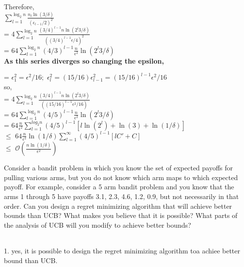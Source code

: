 \documentclass[addpoints,12pt,solution]{exam}
\begin{document}
\begin{questions}
\begin{solution}
Therefore, \\
$\sum_{l=1}^{\log_2 n} \frac{n_l \ln(3/\delta)}{(\epsilon_{l-1}/2)^2}$ \\
= $4 \sum_{l=1}^{\log_2 n} \frac{(3/4)^{l-1}n \ln(2^l 3/\delta)}{((3/4)^{l-1}\epsilon/4)^2}$ \\
= $64 \sum_{l=1}^{\log_2 n} (4/3)^{l-1} \frac{n }{\epsilon^2}\ln(2^l 3/\delta)$ \\
\textbf{As this series diverges so changing the epsilon,}

= $\epsilon_1^2 = \epsilon^2/16 ; $ $\epsilon_l^2 = (15/16) \epsilon^2_{l-1} = (15/16)^{l-1} \epsilon^2/16$ \\
so, \\
= $4 \sum_{l=1}^{\log_2 n} \frac{(3/4)^{l-1}n \ln(2^l 3/\delta)}{((15/16)^{l-1}\epsilon^2/16)}$ \\
= $64 \sum_{l=1}^{\log_2 n} (4/5)^{l-1} \frac{n }{\epsilon^2}\ln(2^l 3/\delta)$ \\
= $64 \frac{n }{\epsilon^2} \sum_{l=1}^{log_2n} (4/5)^{l-1} [l\ln(2^l) + \ln(3) + \ln(1/\delta)]$ \\
$\leq$  $64 \frac{n }{\epsilon^2} \ln(1/\delta) \sum_{l=1}^{\infty} (4/5)^{l-1} [lC' + C ]$ \\ 
$\leq$  $\mathcal{O}(\frac{n \ln(1/\delta) }{\epsilon^2})$

\end{solution}

\question[3] Consider a bandit problem in which you know the set of expected payoffs for pulling various arms, but you do not know which arm maps to which expected payoff. For example, consider a 5 arm bandit problem and you know that the arms 1 through 5 have payoffs 3.1, 2.3, 4.6, 1.2, 0.9, but not necessarily in that order. Can you design a regret minimizing algorithm that will achieve better bounds than UCB? What makes you believe that it is possible? What parts of the analysis of UCB will you modify to achieve better bounds?
\begin{solution}
\\
1. yes, it is possible to design the regret minimizing algorithm toa achiee better bound than UCB.


\end{solution}
\end{questions}
\end{document}
